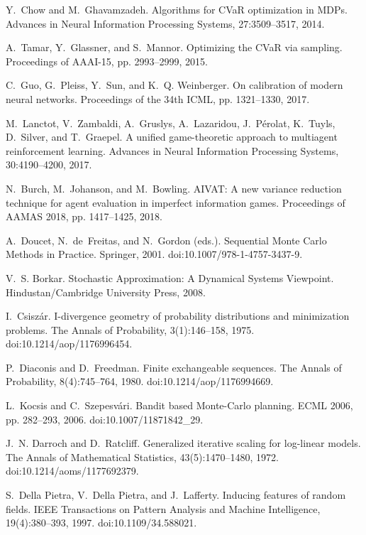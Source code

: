 \begin{thebibliography}{99}
Y.~Chow and M.~Ghavamzadeh.
Algorithms for CVaR optimization in MDPs.
Advances in Neural Information Processing Systems, 27:3509--3517, 2014.

A.~Tamar, Y.~Glassner, and S.~Mannor.
Optimizing the CVaR via sampling.
Proceedings of AAAI-15, pp. 2993--2999, 2015.

C.~Guo, G.~Pleiss, Y.~Sun, and K.~Q. Weinberger.
On calibration of modern neural networks.
Proceedings of the 34th ICML, pp. 1321--1330, 2017.

M.~Lanctot, V.~Zambaldi, A.~Gruslys, A.~Lazaridou, J.~P\'{e}rolat, K.~Tuyls, D.~Silver, and T.~Graepel.
A unified game-theoretic approach to multiagent reinforcement learning.
Advances in Neural Information Processing Systems, 30:4190--4200, 2017.

N.~Burch, M.~Johanson, and M.~Bowling.
AIVAT: A new variance reduction technique for agent evaluation in imperfect information games.
Proceedings of AAMAS 2018, pp. 1417--1425, 2018.

A.~Doucet, N.~de~Freitas, and N.~Gordon (eds.).
Sequential Monte Carlo Methods in Practice.
Springer, 2001. doi:10.1007/978-1-4757-3437-9.

V.~S. Borkar.
Stochastic Approximation: A Dynamical Systems Viewpoint.
Hindustan/Cambridge University Press, 2008.

I.~Csisz\'{a}r.
I-divergence geometry of probability distributions and minimization problems.
The Annals of Probability, 3(1):146--158, 1975. doi:10.1214/aop/1176996454.

P.~Diaconis and D.~Freedman.
Finite exchangeable sequences.
The Annals of Probability, 8(4):745--764, 1980. doi:10.1214/aop/1176994669.

L.~Kocsis and C.~Szepesv\'{a}ri.
Bandit based Monte-Carlo planning.
ECML 2006, pp. 282--293, 2006. doi:10.1007/11871842\_29.

J.~N. Darroch and D.~Ratcliff.
Generalized iterative scaling for log-linear models.
The Annals of Mathematical Statistics, 43(5):1470--1480, 1972. doi:10.1214/aoms/1177692379.

S.~Della Pietra, V.~Della Pietra, and J.~Lafferty.
Inducing features of random fields.
IEEE Transactions on Pattern Analysis and Machine Intelligence, 19(4):380--393, 1997. doi:10.1109/34.588021.


\end{thebibliography}
